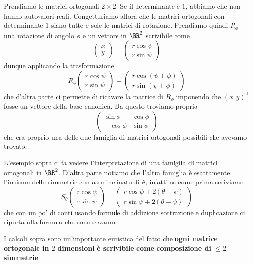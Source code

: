 \documentclass[11pt]{scrartcl}
\begin{document}
   	 \begin{example}[Rotazioni]
   	 	Prendiamo le matrici ortogonali $2\times 2$. Se il determinante è $1$, abbiamo che non hanno autovalori reali. Congetturiamo allora che le matrici ortogonali con determinante $1$ siano tutte e sole le matrici di rotazione. Prendiamo quindi $R_\phi$ una rotazione di angolo $\phi$ e un vettore in $\RR^2$ scrivibile come
   	 	$$\begin{pmatrix}
   	 		x \\
   	 		y
   	 	\end{pmatrix}=
   	 	\begin{pmatrix}
   	 		r \cos \psi \\
   	 		r \sin \psi
   	 	\end{pmatrix}$$
   	 	dunque applicando la trasformazione 
   	 	$$R_\phi\begin{pmatrix}
   	 		r \cos \psi \\
   	 		r \sin \psi
   	 	\end{pmatrix}=
   	 	\begin{pmatrix}
   	 		r \cos\left( \psi + \phi\right) \\
   	 		r \sin\left( \psi + \phi\right)
   	 	\end{pmatrix}
   	 	$$
   	 	che d'altra parte ci permette di ricavare la matrice di $R_\phi $ imponendo che $(x,y)^\intercal$ fosse un vettore della base canonica. Da questo troviamo proprio
   	 	$$
   	 	\begin{pmatrix}
   	 		\sin \phi &  \cos \phi \\
   	 		-\cos \phi & \sin\phi
   	 	\end{pmatrix}
   	 	$$
   	 	che era proprio una delle due famiglia di matrici ortogonali possibili che avevamo trovato.
   	 \end{example}
   	 \begin{example}[Simmetrie]
   	 	L'esempio sopra ci fa vedere l'interpretazione di una famiglia di matrici ortogonali in $\RR^2$. D'altra parte notiamo che l'altra famiglia è esattamente l'insieme delle simmetrie con asse inclinato di $\theta$, infatti se come prima scriviamo
   	 	$$S_\theta\begin{pmatrix}
   	 		r\cos \psi \\
   	 		r\sin \psi
   	 	\end{pmatrix}=
   	 	\begin{pmatrix}
   	 		r\cos \psi+2(\theta-\psi) \\
   	 		r\sin \psi+2(\theta-\psi)
   	 	\end{pmatrix}$$
   	 	che con un po' di conti usando formule di addizione sottrazione e duplicazione ci riporta alla formula che conoscevamo. 
   	 \end{example}
   	 I calcoli sopra sono un'importante euristica del fatto che \textbf{ogni matrice ortogonale in $2$ dimensioni è scrivibile come composizione di $\le 2$ simmetrie}.
   	 
\end{document}
